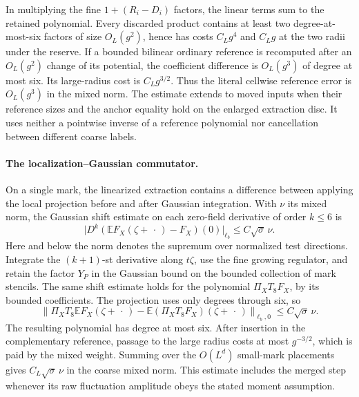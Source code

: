 \documentclass[11pt]{article}
\theoremstyle{definition}
\newcommand{\E}{\mathbb E}
\begin{document}
In multiplying the fine \(1+(R_i-D_i)\) factors, the linear
terms sum to the retained polynomial. Every discarded product
contains at least two degree-at-most-six factors of size
\(O_L(g^2)\), hence has costs \(C_Lg^4\) and \(C_Lg\) at the
two radii under the reserve. If a bounded bilinear ordinary
reference is recomputed after an \(O_L(g^2)\) change of its
potential, the coefficient difference is \(O_L(g^3)\) of
degree at most six. Its large-radius cost is \(C_L g^{3/2}\).
Thus the literal cellwise reference error is \(O_L(g^3)\)
in the mixed norm. The estimate extends to moved inputs
when their reference sizes and the anchor equality hold on
the enlarged extraction disc. It uses neither a pointwise
inverse of a reference polynomial nor cancellation between
different coarse labels.

\paragraph{The localization--Gaussian commutator.}
On a single mark, the linearized extraction contains a difference
between applying the local projection before and after Gaussian
integration. With \(\nu\) its mixed norm, the Gaussian shift estimate
on each zero-field derivative of order \(k\le 6\) is
\begin{equation}
 \bigl|D^k(\E F_X(\zeta+\,\cdot\,) -F_X)(0)\bigr|_{\ell_b}
       \le C \sqrt{\sigma}\,\nu .
\end{equation}
Here and below the norm denotes the supremum over normalized
test directions. Integrate the \((k+1)\)-st derivative along
\(t\zeta\), use the fine growing regulator, and retain the
factor \(Y_P\) in the Gaussian bound on the bounded collection
of mark stencils. The same shift estimate holds for the
polynomial \(\Pi_X T_8 F_X\), by its bounded coefficients.
The projection uses only degrees through six, so
\begin{equation}
 \|\Pi_X T_8\E F_X(\zeta+\,\cdot\,)
              -\E(\Pi_X T_8 F_X)(\zeta+\,\cdot\,)\|_{\ell_b,0}
       \le C\sqrt{\sigma}\,\nu .
\end{equation}
The resulting polynomial has degree at most six. After insertion
in the complementary reference, passage to the large radius
costs at most \(g^{-3/2}\), which is paid by the mixed weight.
Summing over the \(O(L^d)\) small-mark placements gives
\(C_L\sqrt{\sigma}\,\nu\) in the coarse mixed norm. This
estimate includes the merged step whenever its raw
fluctuation amplitude obeys the stated moment assumption.
\end{document}

